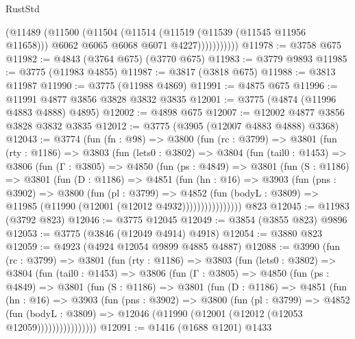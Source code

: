 \begin{lexlean}{RustStd}
\begin{coremodule}
{\begin{coremodule}
{{{{{{{{{{{{{{{{{{{{{{{{{{{{{{{                  (@11489
                    (@11500
                      (@11504
                        (@11514
                          (@11519 (@11539 (@11545 @11956 @11658)))
                          @6062
                          @6065
                          @6068
                          @6071
                          @4227)))))))))))
@11978 := @3758 @675
@11982 := @4843 (@3764 @675) (@3770 @675)
@11983 := @3779 @9893
@11985 := @3775 (@11983 @4855)
@11987 := @3817 (@3818 @675)
@11988 := @3813 @11987
@11990 := @3775 (@11988 @4869)
@11991 := @4875 @675
@11996 := @11991 @4877 @3856 @3828 @3832 @3835
@12001 := @3775 (@4874 (@11996 @4883 @4888) @4895)
@12002 := @4898 @675
@12007 := @12002 @4877 @3856 @3828 @3832 @3835
@12012 := @3775 (@3905 (@12007 @4883 @4888) @3368)
@12043 := @3774
    (fun (fn : @98) =>
    @3800
      (fun (rc : @3799) =>
      @3801
        (fun (rty : @1186) =>
        @3803
          (fun (lets0 : @3802) =>
          @3804
            (fun (tail0 : @1453) =>
            @3806
              (fun (Γ : @3805) =>
              @4850
                (fun (ps : @4849) =>
                @3801
                  (fun (S : @1186) =>
                  @3801
                    (fun (D : @1186) =>
                    @4851
                      (fun (hn : @16) =>
                      @3903
                        (fun (pns : @3902) =>
                        @3800
                          (fun (pl : @3799) =>
                          @4852
                            (fun (bodyL : @3809) =>
                            @11985 (@11990 (@12001 (@12012 @4932))))))))))))))))
    @823
@12045 := @11983 (@3792 @823)
@12046 := @3775 @12045
@12049 := @3854 (@3855 @823) @9896
@12053 := @3775 (@3846 (@12049 @4914) @4918)
@12054 := @3880 @823
@12059 := @4923 (@4924 @12054 @9899 @4885 @4887)
@12088 := @3990
    (fun (rc : @3799) =>
    @3801
      (fun (rty : @1186) =>
      @3803
        (fun (lets0 : @3802) =>
        @3804
          (fun (tail0 : @1453) =>
          @3806
            (fun (Γ : @3805) =>
            @4850
              (fun (ps : @4849) =>
              @3801
                (fun (S : @1186) =>
                @3801
                  (fun (D : @1186) =>
                  @4851
                    (fun (hn : @16) =>
                    @3903
                      (fun (pns : @3902) =>
                      @3800
                        (fun (pl : @3799) =>
                        @4852
                          (fun (bodyL : @3809) =>
                          @12046 (@11990 (@12001 (@12012 (@12053 @12059))))))))))))))))
@12091 := @1416 (@1688 @1201) @1433
}}}}}}}}}}}}}}}}}}}}}}}}}}}}}}}
\end{coremodule}}
\end{coremodule}
\end{lexlean}
